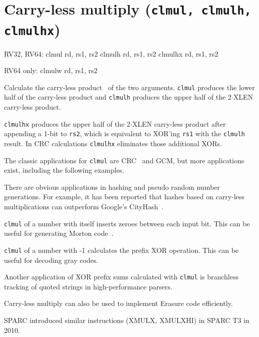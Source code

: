 
\section{Carry-less multiply (\texttt{clmul, clmulh, clmulhx})}

\begin{rvb}
  RV32, RV64:
    clmul rd, rs1, rs2
    clmulh rd, rs1, rs2
    clmulhx rd, rs1, rs2

  RV64 only:
    clmulw rd, rs1, rs2
\end{rvb}

Calculate the carry-less product~\cite{CarryLessProduct} of the two arguments. \texttt{clmul}
produces the lower half of the carry-less product and \texttt{clmulh} produces the upper half
of the 2$\cdot$XLEN carry-less product.

\texttt{clmulhx} produces the upper half of the 2$\cdot$XLEN carry-less product after appending
a 1-bit to {\tt rs2}, which is equivalent to XOR'ing {\tt rs1} with the {\tt clmulh} result.
In CRC calculations {\tt clmulhx} eliminates those additional XORs.



The classic applications for \texttt{clmul} are CRC~\cite{FastCRC,Wolf18A} and GCM, but more
applications exist, including the following examples.

There are obvious applications in hashing and pseudo random number generations. For
example, it has been reported that hashes based on carry-less multiplications can
outperform Google's CityHash~\cite{CLHASH}.

\texttt{clmul} of a number with itself inserts zeroes between each input bit. This can
be useful for generating Morton code~\cite{MortonCode}.

\texttt{clmul} of a number with -1 calculates the prefix XOR operation. This can
be useful for decoding gray codes.

Another application of XOR prefix sums calculated with \texttt{clmul} is
branchless tracking of quoted strings in high-performance parsers.~\cite{ParseJSON}

Carry-less multiply can also be used to implement Erasure code efficiently.~\cite{ClmulErasureCode}

SPARC introduced similar instructions (XMULX, XMULXHI) in SPARC T3 in 2010.


